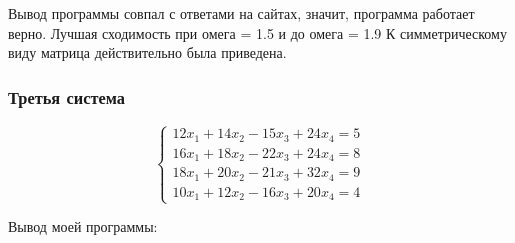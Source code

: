 \documentclass[a4paper,12pt,titlepage,finall]{article}
\begin{document}
Вывод программы совпал с ответами на сайтах, значит, программа работает верно.
Лучшая сходимость при омега = 1.5 и до омега = 1.9
К симметрическому виду матрица действительно была приведена.

\subsubsection{Третья система}

\begin{equation*}
 \begin{cases}
   12x_1 + 14x_2 - 15x_3 + 24x_4 = 5 
   \\
   16x_1 + 18x_2 - 22x_3 + 24x_4 = 8
   \\
   18x_1 + 20x_2 - 21x_3 + 32x_4 = 9
   \\
   10x_1 + 12x_2 - 16x_3 + 20x_4 = 4
 \end{cases}
\end{equation*}


Вывод моей программы:
\end{document}
